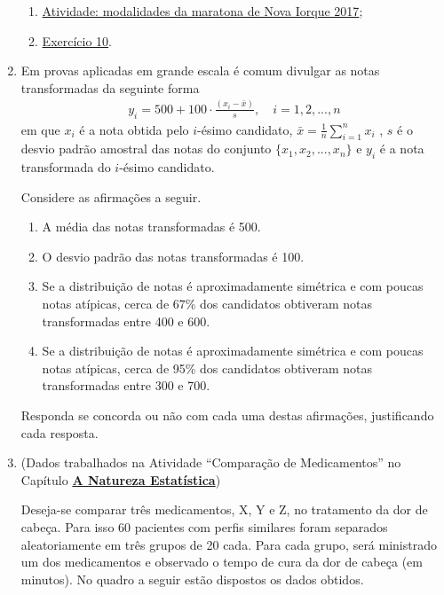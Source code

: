 \begin{enumerate}
\begin{enumerate}
\item {} 
\hyperref[\detokenize{PE104-7:ativ-comparacaodegruposusandoboxplot}]{Atividade: modalidades da maratona de Nova Iorque 2017};

\item {} 
\hyperref[exercicio-10]{Exercício 10}.

\end{enumerate}

\item Em provas aplicadas em grande escala é comum divulgar as notas transformadas da seguinte forma
\begin{equation*}
\begin{split}y_i = 500+100\cdot \frac{(x_i-\bar{x})}{s}, \quad i=1,2,...,n\end{split}
\end{equation*}
em que \(x_i\) é a nota obtida pelo \(i\)-ésimo candidato, \(\bar{x}=\frac{1}{n}\displaystyle{\sum^n_{i=1}}x_i\) , \(s\) é o desvio padrão amostral das notas do conjunto \(\{ x_1,x_2, ..., x_n\}\) e \(y_i\) é a nota transformada do \(i\)-ésimo candidato.

Considere as afirmações a seguir.
\begin{enumerate}
\item {} 
A média das notas transformadas é 500.

\item {} 
O desvio padrão das notas transformadas é 100.

\item {} 
Se a distribuição de notas é aproximadamente simétrica e com poucas notas atípicas, cerca de 67\% dos candidatos obtiveram notas transformadas entre 400 e 600.

\item {} 
Se a distribuição de notas é aproximadamente simétrica e com poucas notas atípicas, cerca de 95\% dos candidatos obtiveram notas transformadas entre 300 e 700.

\end{enumerate}

Responda se concorda ou não com cada uma destas afirmações, justificando cada resposta.

\item (Dados trabalhados na Atividade “Comparação de Medicamentos”{} no Capítulo \textbf{\hyperref[est1-chap]{A Natureza Estatística}})

Deseja-se comparar três medicamentos, X, Y e Z, no tratamento da dor de cabeça. Para isso 60 pacientes com perfis similares foram separados aleatoriamente em três grupos de 20 cada. Para cada grupo,  será ministrado um dos medicamentos e observado o tempo de cura da dor de cabeça (em minutos). No quadro a seguir estão dispostos os dados obtidos.


\end{enumerate}
